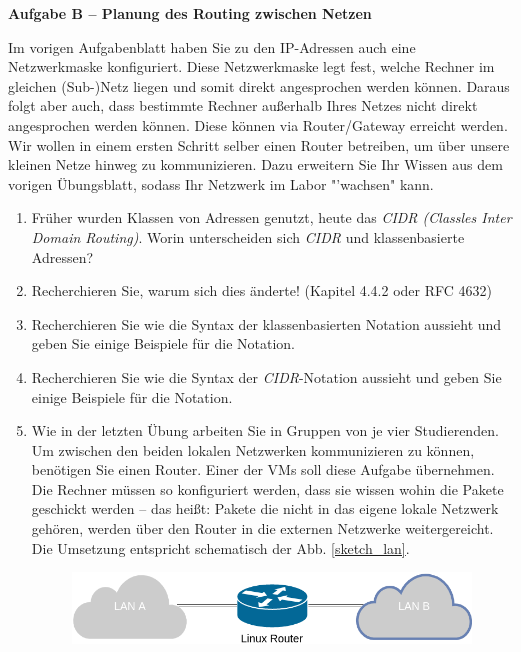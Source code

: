 \documentclass[paper=a4,fontsize=11pt]{scrartcl}%
\numberwithin{equation}{section}
\begin{document}
\begin{center}
\Large{\textbf{Aufgabe B -- Planung des Routing zwischen Netzen}}
\end{center}
\vskip0.25in
Im vorigen Aufgabenblatt haben Sie zu den IP-Adressen auch eine Netzwerkmaske konfiguriert. Diese Netzwerkmaske legt fest, welche Rechner im gleichen (Sub-)Netz liegen und somit direkt angesprochen werden können. Daraus folgt aber auch, dass bestimmte Rechner außerhalb Ihres Netzes nicht direkt angesprochen werden können. Diese können via Router/Gateway erreicht werden.\\
Wir wollen in einem ersten Schritt selber einen Router betreiben, um über unsere kleinen Netze hinweg zu kommunizieren. Dazu erweitern Sie Ihr Wissen aus dem vorigen Übungsblatt, sodass Ihr Netzwerk im Labor "'wachsen" kann.
\begin{enumerate}
	\item Früher wurden Klassen von Adressen genutzt, heute das \emph{CIDR (Classles Inter Domain Routing)}. Worin unterscheiden sich \emph{CIDR} und klassenbasierte Adressen?
	\item Recherchieren Sie, warum sich dies änderte! (Kapitel 4.4.2 \cite[S. 338ff]{Kurose2012} oder RFC 4632)
	\item Recherchieren Sie wie die Syntax der klassenbasierten Notation aussieht und geben Sie einige Beispiele für die Notation.
	\item Recherchieren Sie wie die Syntax der \emph{CIDR}-Notation aussieht und geben Sie einige Beispiele für die Notation.
	\item Wie in der letzten Übung arbeiten Sie in Gruppen von je vier Studierenden.\\
	Um zwischen den beiden lokalen Netzwerken kommunizieren zu können, benötigen Sie einen Router. Einer der VMs soll diese Aufgabe übernehmen.\\
	Die Rechner müssen so konfiguriert werden, dass sie wissen wohin die Pakete geschickt werden -- das heißt: Pakete die nicht in das eigene lokale Netzwerk gehören, werden über den Router in die externen Netzwerke weitergereicht. Die Umsetzung entspricht schematisch der Abb. \ref{sketch_lan}.
	\begin{figure}[H]
	\centering
	\includegraphics[scale=0.35]{lan}

\end{figure}
\end{enumerate}
\end{document}
